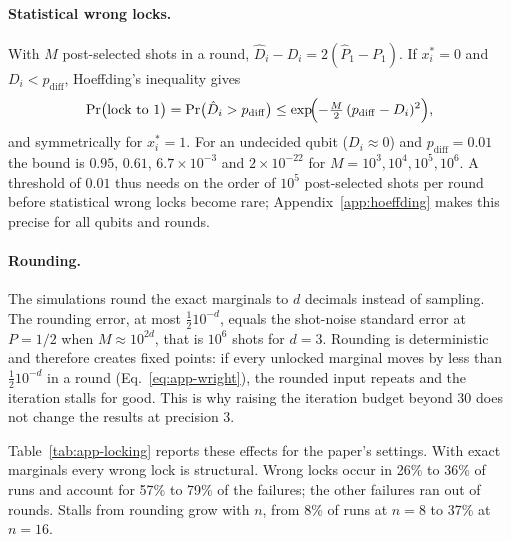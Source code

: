 \paragraph{Statistical wrong locks.} With $M$ post-selected shots in a round, $\hat D_i-D_i=2(\hat P_1-P_1)$. If $x^*_i=0$ and $D_i<p_{\mathrm{diff}}$, Hoeffding's inequality gives
\begin{equation}
\Pr\bigl(\text{lock to }1\bigr)=\Pr\bigl(\hat D_i>p_{\mathrm{diff}}\bigr)\le\exp\!\Bigl(-\tfrac{M}{2}\,(p_{\mathrm{diff}}-D_i)^2\Bigr),
\label{eq:app-statlock}
\end{equation}
and symmetrically for $x^*_i=1$. For an undecided qubit ($D_i\approx0$) and $p_{\mathrm{diff}}=0.01$ the bound is $0.95$, $0.61$, $6.7\times10^{-3}$ and $2\times10^{-22}$ for $M=10^3,10^4,10^5,10^6$. A threshold of $0.01$ thus needs on the order of $10^5$ post-selected shots per round before statistical wrong locks become rare; Appendix~\ref{app:hoeffding} makes this precise for all qubits and rounds.

\paragraph{Rounding.} The simulations round the exact marginals to $d$ decimals instead of sampling. The rounding error, at most $\frac12 10^{-d}$, equals the shot-noise standard error at $P=1/2$ when $M\approx10^{2d}$, that is $10^6$ shots for $d=3$. Rounding is deterministic and therefore creates fixed points: if every unlocked marginal moves by less than $\frac12 10^{-d}$ in a round (Eq.~\eqref{eq:app-wright}), the rounded input repeats and the iteration stalls for good. This is why raising the iteration budget beyond 30 does not change the results at precision 3.

Table~\ref{tab:app-locking} reports these effects for the paper's settings. With exact marginals every wrong lock is structural. Wrong locks occur in 26\% to 36\% of runs and account for 57\% to 79\% of the failures; the other failures ran out of rounds. Stalls from rounding grow with $n$, from 8\% of runs at $n=8$ to 37\% at $n=16$.

